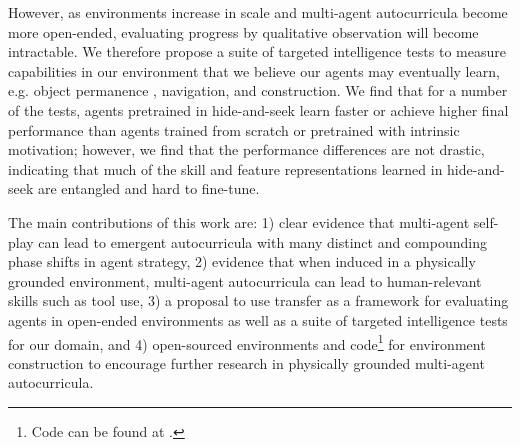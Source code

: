 However, as environments increase in scale and multi-agent autocurricula become more open-ended, evaluating progress by qualitative observation will become intractable.
We therefore propose a suite of targeted intelligence tests to measure capabilities in our environment that we believe our agents may eventually learn, e.g. object permanence \citep{baillargeon2012}, navigation, and construction.
We find that for a number of the tests, agents pretrained in hide-and-seek learn faster or achieve higher final performance than agents trained from scratch or pretrained with intrinsic motivation; however, we find that the performance differences are not drastic, indicating that much of the skill and feature representations learned in hide-and-seek are entangled and hard to fine-tune.

The main contributions of this work are:
1) clear evidence that multi-agent self-play can lead to emergent autocurricula with many distinct and compounding phase shifts in agent strategy,
2) evidence that when induced in a physically grounded environment, multi-agent autocurricula can lead to human-relevant skills such as tool use,
3) a proposal to use transfer as a framework for evaluating agents in open-ended environments as well as a suite of targeted intelligence tests for our domain, and
4) open-sourced environments and code\footnote{Code can be found at \href{\codeurlclick}{\texttt{\codeurl}}.}
for environment construction to encourage further research in physically grounded multi-agent autocurricula.